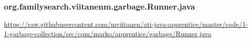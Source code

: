 \subsubsection*{org.familysearch.viitanenm.garbage.Runner.java}
\noindent    \begin{minipage}{.6in}
    \end{minipage}
    \begin{minipage}{6in}
      \url{https://raw.githubusercontent.com/mviitanen/ati-java-apprentice/master/code/1-1-garbage-collection/src/com/marko/apprentice/garbage/Runner.java}
    \end{minipage}

